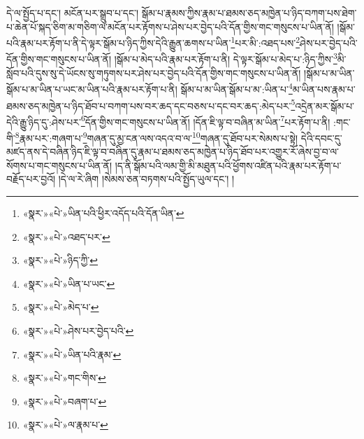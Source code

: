 དེ་ལ་སྤྱོད་པ་དང་། མངོན་པར་སྒྲུབ་པ་དང་། སྒོམ་པ་རྣམས་ཀྱིས་རྣམ་པ་ཐམས་ཅད་མཁྱེན་པ་ཉིད་བཀག་པས་ཐེག་པ་ཆེན་པོ་སྐད་ཅིག་མ་གཅིག་ལ་མངོན་པར་རྟོགས་པ་ཤེས་པར་བྱེད་པའི་དོན་གྱིས་གང་གསུངས་པ་ཡིན་ནོ། །སྒོམ་པའི་རྣམ་པར་རྟོག་པ་ནི་དེ་ལྟར་སྒོམ་པ་ཉིད་ཀྱིས་དེའི་རྒྱུན་ཆགས་པ་ཡིན་\footnote{«སྣར་»«པེ་»ཡིན་པའི་ཕྱིར་འདོད་པའི་དོན་ཡིན་}པར་མི་:འཐད་པས་\footnote{«སྣར་»«པེ་»འཐད་པར་}ཤེས་པར་བྱེད་པའི་དོན་གྱིས་གང་གསུངས་པ་ཡིན་ནོ། །སྒོམ་པ་མེད་པའི་རྣམ་པར་རྟོག་པ་ནི། དེ་ལྟར་སྒོམ་པ་མེད་པ་:ཉིད་ཀྱིས་\footnote{«སྣར་»«པེ་»ཉིད་ཀྱི་}མི་སློབ་པའི་དུས་སུ་དེ་ཡོངས་སུ་གཏུགས་པར་ཤེས་པར་བྱེད་པའི་དོན་གྱིས་གང་གསུངས་པ་ཡིན་ནོ། །སྒོམ་པ་མ་ཡིན་སྒོམ་པ་མ་ཡིན་པ་ཡང་མ་ཡིན་པའི་རྣམ་པར་རྟོག་པ་ནི། སྒོམ་པ་མ་ཡིན་སྒོམ་པ་མ་:ཡིན་པ་\footnote{«སྣར་»«པེ་»ཡིན་པ་ཡང་}མ་ཡིན་པས་རྣམ་པ་ཐམས་ཅད་མཁྱེན་པ་ཉིད་ཐོབ་པ་བཀག་པས་བར་ཆད་དང་བཅས་པ་དང་བར་ཆད་:མེད་པར་\footnote{«སྣར་»«པེ་»མེད་པ་}འདྲེན་མར་སྒོམ་པ་དེའི་རྒྱུ་ཉིད་དུ་:ཤེས་པར་\footnote{«སྣར་»«པེ་»ཤེས་པར་བྱེད་པའི་}དོན་གྱིས་གང་གསུངས་པ་ཡིན་ནོ། །དོན་ཇི་ལྟ་བ་བཞིན་མ་ཡིན་\footnote{«སྣར་»«པེ་»ཡིན་པའི་རྣམ་}པར་རྟོག་པ་ནི། :གང་གི་\footnote{«སྣར་»«པེ་»གང་གིས་}རྣམ་པར་:གཞག་པ་\footnote{«སྣར་»«པེ་»བཞག་པ་}གཞན་དུ་མྱ་ངན་ལས་འདའ་བ་ལ་\footnote{«སྣར་»«པེ་»ལ་རྣམ་པ་}གཞན་དུ་ཐོབ་པར་སེམས་པ་སྟེ། དེའི་དབང་དུ་མཛད་ནས་དེ་བཞིན་ཉིད་ཇི་ལྟ་བ་བཞིན་དུ་རྣམ་པ་ཐམས་ཅད་མཁྱེན་པ་ཉིད་ཐོབ་པར་འགྱུར་རོ་ཞེས་བྱ་བ་ལ་སོགས་པ་གང་གསུངས་པ་ཡིན་ནོ། །ད་ནི་སྒོམ་པའི་ལམ་གྱི་མི་མཐུན་པའི་ཕྱོགས་འཛིན་པའི་རྣམ་པར་རྟོག་པ་བརྗོད་པར་བྱའོ། །དེ་ལ་རེ་ཞིག །སེམས་ཅན་བཏགས་པའི་སྤྱོད་ཡུལ་དང་། །
